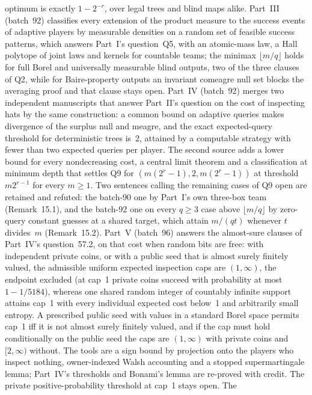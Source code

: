 \documentclass[11pt]{article}
\begin{document}
{optimum is exactly $1-2^{-r}$, over legal trees and blind maps alike.
Part~III (batch~92) classifies every extension of the product measure to
the success events of adaptive players by measurable densities on a random
set of feasible success patterns, which answers Part~I's question~Q5, with
an atomic-mass law, a Hall polytope of joint laws and kernels for countable
teams; the minimax $\lfloor m/q\rfloor$ holds for full Borel and
universally measurable blind outputs, two of the three clauses of Q2,
while for Baire-property outputs an invariant comeagre null set blocks the
averaging proof and that clause stays open.  Part~IV (batch~92) merges two
independent manuscripts that answer Part~II's question on the cost of
inspecting hats by the same construction: a common bound on adaptive
queries makes divergence of the surplus null and meagre, and the exact
expected-query threshold for deterministic trees is~2, attained by a
computable strategy with fewer than two expected queries per player.  The
second source adds a lower bound for every nondecreasing cost, a central
limit theorem and a classification at minimum depth that settles Q9 for
$(m(2^r-1),2,m(2^r-1))$ at threshold $m2^{r-1}$ for every $m\ge1$.  Two
sentences calling the remaining cases of Q9 open are retained and refuted:
the batch-90 one by Part~I's own three-box team (Remark~15.1), and the
batch-92 one on every $q\ge3$ case above $\lfloor m/q\rfloor$ by
zero-query constant guesses at a shared target, which attain $m/(qt)$
whenever $t$ divides~$m$ (Remark~15.2).
Part~V (batch~96) answers the almost-sure clauses of Part~IV's
question~57.2, on that cost when random bits are free: with independent
private coins, or with a public seed that is almost surely finitely
valued, the admissible uniform expected inspection caps are $(1,\infty)$,
the endpoint excluded (at cap~1 private coins succeed with probability at
most $1-1/5184$), whereas one shared random integer of countably infinite
support attains cap~1 with every individual expected cost below~1 and
arbitrarily small entropy.  A prescribed public seed with values in a
standard Borel space permits cap~1 iff it is not almost surely finitely
valued, and if the cap must hold conditionally on the public seed the
caps are $(1,\infty)$ with private coins and $[2,\infty)$ without.  The
tools are a sign bound by projection onto the players who inspect
nothing, owner-indexed Walsh accounting and a stopped supermartingale
lemma; Part~IV's thresholds and Bonami's lemma are re-proved with credit.
The private positive-probability threshold at cap~1 stays open.  The
}
\end{document}
